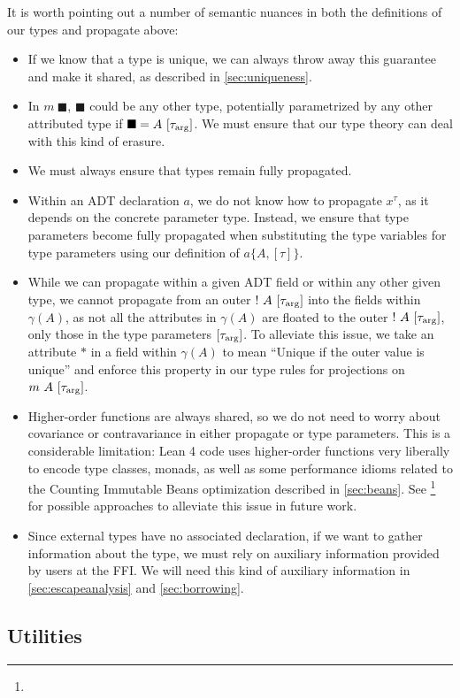 It is worth pointing out a number of semantic nuances in both the definitions of our types and propagate above:
\begin{itemize}
	\item If we know that a type is unique, we can always throw away this guarantee and make it shared, as described in \cref{sec:uniqueness}.
	\item In $m\ \blacksquare$, $\blacksquare$ could be any other type, potentially parametrized by any other attributed type if $\blacksquare = A\ [\tau_\arrg]$. We must ensure that our type theory can deal with this kind of erasure.
	\item We must always ensure that types remain fully propagated.
	\item Within an ADT declaration $a$, we do not know how to propagate $x^\tau$, as it depends on the concrete parameter type. Instead, we ensure that type parameters become fully propagated when substituting the type variables for type parameters using our definition of $a\{A, [\tau]\}$.
	\item While we can propagate within a given ADT field or within any other given type, we cannot propagate from an outer $!\ A\ [\tau_\arrg]$ into the fields within $\gamma(A)$, as not all the attributes in $\gamma(A)$ are floated to the outer $!\ A\ [\tau_\arrg]$, only those in the type parameters $[\tau_{\mathrm{arg}}]$. To alleviate this issue, we take an attribute $*$ in a field within $\gamma(A)$ to mean ``Unique if the outer value is unique'' and enforce this property in our type rules for projections on $m\ A\ [\tau_\arrg]$.
	\item Higher-order functions are always shared, so we do not need to worry about covariance or contravariance in either propagate or type parameters. This is a considerable limitation: Lean 4 code uses higher-order functions very liberally to encode type classes, monads, as well as some performance idioms related to the Counting Immutable Beans optimization described in \cref{sec:beans}. See \footnote{} for possible approaches to alleviate this issue in future work.
	\item Since external types have no associated declaration, if we want to gather information about the type, we must rely on auxiliary information provided by users at the FFI. We will need this kind of auxiliary information in \cref{sec:escapeanalysis} and \cref{sec:borrowing}.
\end{itemize}

\subsection{Utilities}

